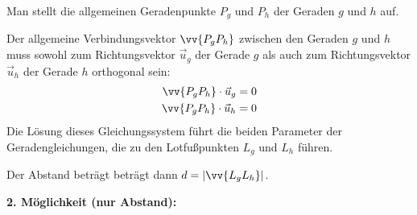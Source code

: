 \documentclass{article}
\begin{document}
    Man stellt die allgemeinen Geradenpunkte $P_g$ und $P_h$ der Geraden $g$ und $h$ auf.

    Der allgemeine Verbindungsvektor $\vv{P_gP_h}$ zwischen den Geraden $g$ und $h$ muss
    sowohl zum Richtungsvektor $\vec{u}_g$ der Gerade $g$ als auch zum Richtungsvektor $\vec{u}_h$
    der Gerade $h$ orthogonal sein:
    \begin{align}
        \vv{P_gP_h} \cdot \vec{u}_g = 0 \\
        \vv{P_gP_h} \cdot \vec{u}_h = 0 
    \end{align}
    Die Lösung dieses Gleichungssystem führt die beiden Parameter der Geradengleichungen,
    die zu den Lotfußpunkten $L_g$ und $L_h$ führen.
    
    Der Abstand beträgt beträgt dann $d = |\vv{L_gL_h}|$.\\
    \medskip

\textbf{2. Möglichkeit (nur Abstand):}
\end{document}
